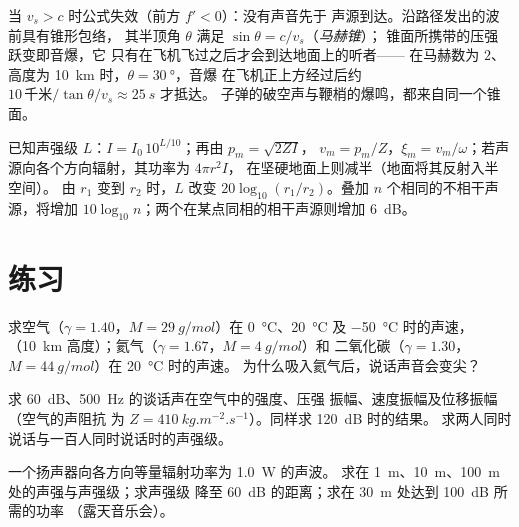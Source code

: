 \begin{remark}[超音速]\label{rem:b2:sound-waves:mach}
当 $v_s > c$ 时公式失效（前方 $f' < 0$）：没有声音先于
声源到达。沿路径发出的波前具有锥形包络，
其半顶角 $\theta$ 满足 $\sin\theta = c/v_s$（\emph{马赫锥}）；
锥面所携带的压强跃变即音爆，它
只有在飞机飞过之后才会到达地面上的听者——
在马赫数为 $2$、高度为 \qty{10}{km} 时，$\theta = \qty{30}{\degree}$，音爆
在飞机正上方经过后约 $10\,\text{千米}/\tan\theta/v_s \approx \qty{25}{s}$ 才抵达。
子弹的破空声与鞭梢的爆鸣，都来自同一个锥面。
\end{remark}

\begin{method}[声学中的数量级]\label{met:b2:sound-waves:method}
已知声强级 $L$：$I = I_0\,10^{L/10}$；再由 $p_m = \sqrt{2ZI}$，
$v_m = p_m/Z$，$\xi_m = v_m/\omega$；若声源向各个方向辐射，其功率为 $4\pi r^2I$，
在坚硬地面上则减半（地面将其反射入半空间）。
由 $r_1$ 变到 $r_2$ 时，$L$ 改变
$20\log_{10}(r_1/r_2)$。叠加 $n$ 个相同的不相干声源，将增加
$10\log_{10}n$；两个在某点同相的相干声源则增加 \qty{6}{dB}。
\end{method}

\section{练习}

\begin{exercise}[$\star$]\label{exo:b2:sound-waves:1}
求空气（$\gamma = 1.40$，$M = \qty{29}{g/mol}$）在
\qty{0}{\degreeCelsius}、\qty{20}{\degreeCelsius} 及 \qty{-50}{\degreeCelsius} 时的声速，
（\qty{10}{km} 高度）；氦气（$\gamma = 1.67$，$M = \qty{4}{g/mol}$）和
二氧化碳（$\gamma = 1.30$，$M = \qty{44}{g/mol}$）在 \qty{20}{\degreeCelsius} 时的声速。
为什么吸入氦气后，说话声音会变尖？
\end{exercise}

\begin{exercise}[$\star$]\label{exo:b2:sound-waves:2}
求 \qty{60}{dB}、\qty{500}{Hz} 的谈话声在空气中的强度、压强
振幅、速度振幅及位移振幅（空气的声阻抗
为 $Z = \qty{410}{kg.m^{-2}.s^{-1}}$）。同样求 \qty{120}{dB} 时的结果。
求两人同时说话与一百人同时说话时的声强级。
\end{exercise}

\begin{exercise}[$\star$]\label{exo:b2:sound-waves:3}
一个扬声器向各方向等量辐射功率为 \qty{1.0}{W} 的声波。
求在 \qty{1}{m}、\qty{10}{m}、\qty{100}{m} 处的声强与声强级；求声强级
降至 \qty{60}{dB} 的距离；求在 \qty{30}{m} 处达到 \qty{100}{dB} 所需的功率
（露天音乐会）。
\end{exercise}

